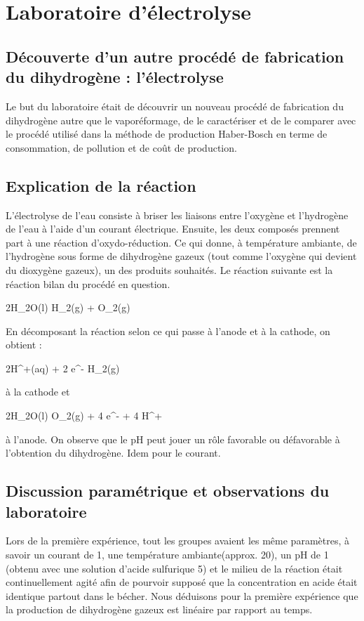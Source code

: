 \section{Laboratoire d'électrolyse}
\subsection{Découverte d'un autre procédé de fabrication du dihydrogène : l'électrolyse}
Le but du laboratoire était de découvrir un nouveau procédé de
fabrication du dihydrogène autre que le vaporéformage, de le
caractériser et de le comparer avec le procédé utilisé dans la
méthode de production Haber-Bosch en terme de consommation, de
pollution et de coût de production.

\subsection{Explication de la réaction}
L'électrolyse de l'eau consiste à briser les liaisons entre
l'oxygène et l'hydrogène de l'eau à l'aide d'un courant électrique.
Ensuite, les deux composés prennent part à une réaction d'oxydo-réduction.
Ce qui donne, à température ambiante, de l'hydrogène sous forme de
dihydrogène gazeux (tout comme l'oxygène qui devient du dioxygène gazeux),
un des produits souhaités. Le réaction suivante est la réaction bilan du
procédé en question.

\begin{chemmath}
	2H_2O(l)  H_2(g) + O_2(g)
\end{chemmath}

En décomposant la réaction selon ce qui passe à l'anode et à la cathode,
on obtient :

\begin{chemmath}
	2H^+(aq) + 2 e^- \rightleftharpoons H_2(g)
\end{chemmath}

à la cathode et

\begin{chemmath}
	2H_2O(l) \rightleftharpoons O_2(g) + 4 e^- + 4 H^+
\end{chemmath}

à l'anode. On observe que le pH peut jouer un rôle favorable ou
défavorable à l'obtention du dihydrogène. Idem pour le courant.

\subsection{Discussion paramétrique et observations du laboratoire}
Lors de la première expérience, tout les groupes avaient les même paramètres,
à savoir un courant de \unit{1}{\ampere}, une température ambiante(approx. \unit{20}{\celsius}),
un pH de 1 (obtenu avec une solution d'acide sulfurique \unit{5}{\mole\per\liter}) et le milieu de
la réaction était continuellement agité afin de pourvoir supposé que la
concentration en acide était identique partout dans le bécher. Nous déduisons
pour la première expérience que la production de dihydrogène gazeux est linéaire
par rapport au temps.

